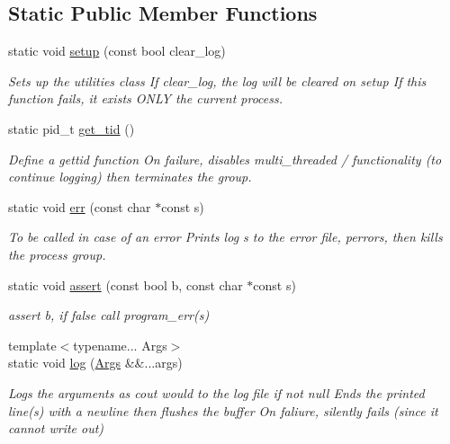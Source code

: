 \subsection*{Static Public Member Functions}
\begin{DoxyCompactItemize}
\item 
static void \hyperlink{class_utilities_aa448e199bdc43fe62e9b9b989a7f667b}{setup} (const bool clear\-\_\-log)
\begin{DoxyCompactList}\small\item\em Sets up the utilities class If clear\-\_\-log, the log will be cleared on setup If this function fails, it exists {\itshape O\-N\-L\-Y} the current process. \end{DoxyCompactList}\item 
static pid\-\_\-t \hyperlink{class_utilities_a93f3699cf92128c66efa084ff1399a45}{get\-\_\-tid} ()
\begin{DoxyCompactList}\small\item\em Define a gettid function On failure, disables multi\-\_\-threaded / functionality (to continue logging) then terminates the group. \end{DoxyCompactList}\item 
static void \hyperlink{class_utilities_a5308da50597c93aad2b1ca2ecfbcb723}{err} (const char $\ast$const s)
\begin{DoxyCompactList}\small\item\em To be called in case of an error Prints log s to the error file, perrors, then kills the process group. \end{DoxyCompactList}\item 
static void \hyperlink{class_utilities_a22c85a2970e168ca0b9ad6fd86752792}{assert} (const bool b, const char $\ast$const s)
\begin{DoxyCompactList}\small\item\em assert b, if false call program\-\_\-err(s) \end{DoxyCompactList}\item 
{\footnotesize template$<$typename... Args$>$ }\\static void \hyperlink{class_utilities_a996db67175e47946e80539602c2ca6ee}{log} (\hyperlink{struct_args}{Args} \&\&...args)
\begin{DoxyCompactList}\small\item\em Logs the arguments as cout would to the log file if not null Ends the printed line(s) with a newline then flushes the buffer On faliure, silently fails (since it cannot write out) \end{DoxyCompactList}\item 

\end{DoxyCompactItemize}
